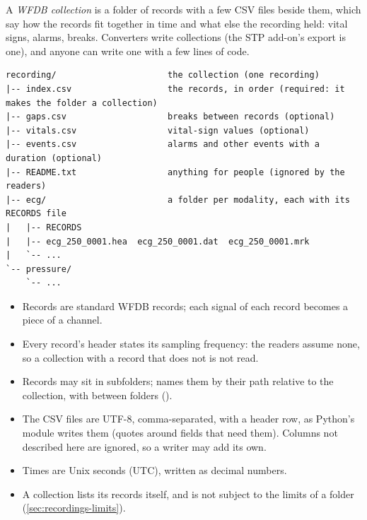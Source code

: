 A \emph{WFDB collection} is a folder of records with a few CSV files beside them, which say how
the records fit together in time and what else the recording held: vital signs, alarms, breaks.
Converters write collections (the STP add-on's  export is one), and anyone can write
one with a few lines of code.
\begin{lstlisting}[style=text]
recording/                      the collection (one recording)
|-- index.csv                   the records, in order (required: it makes the folder a collection)
|-- gaps.csv                    breaks between records (optional)
|-- vitals.csv                  vital-sign values (optional)
|-- events.csv                  alarms and other events with a duration (optional)
|-- README.txt                  anything for people (ignored by the readers)
|-- ecg/                        a folder per modality, each with its RECORDS file
|   |-- RECORDS
|   |-- ecg_250_0001.hea  ecg_250_0001.dat  ecg_250_0001.mrk
|   `-- ...
`-- pressure/
    `-- ...
\end{lstlisting}
\begin{itemize}
\item Records are standard WFDB records; each signal of each record becomes a piece of a channel.
\item Every record's header states its sampling frequency: the readers assume none, so a
  collection with a record that does not is not read.
\item Records may sit in subfolders;  names them by their path relative to the
  collection, with \code{/} between folders ().
\item The CSV files are UTF-8, comma-separated, with a header row, as Python's  module
  writes them (quotes around fields that need them). Columns not described here are ignored, so a
  writer may add its own.
\item Times are Unix seconds (UTC), written as decimal numbers.
\item A collection lists its records itself, and is not subject to the limits of a folder
  (\cref{sec:recordings-limits}).
\end{itemize}


